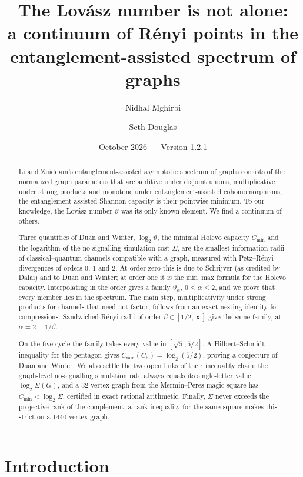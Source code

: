 \documentclass[11pt]{article}
\title{The Lov\'asz number is not alone:\\[3pt]
\large a continuum of R\'enyi points in the entanglement-assisted spectrum of graphs}
\author{Nidhal Mghirbi \and Seth Douglas}
\date{October 2026 --- Version 1.2.1}
\theoremstyle{definition}
\newcommand{\vt}{\vartheta}
\newcommand{\Cmin}{C_{\min}}
\begin{document}
\maketitle

\begin{abstract}
Li and Zuiddam's entanglement-assisted asymptotic spectrum of graphs consists
of the normalized graph parameters that are additive under disjoint unions,
multiplicative under strong products and monotone under
entanglement-assisted cohomomorphisms; the entanglement-assisted Shannon
capacity is their pointwise minimum.  To our knowledge, the Lov\'asz number
$\vt$ was its only known element.  We find a continuum of others.

Three quantities of Duan and Winter, $\log_2\vt$, the minimal Holevo capacity
$\Cmin$ and the logarithm of the no-signalling simulation cost $\Sigma$, are
the smallest information radii of classical--quantum channels compatible with
a graph, measured with Petz--R\'enyi divergences of orders $0$, $1$ and $2$.
At order zero this is due to Schrijver (as credited by Dalai) and to Duan and
Winter; at order one it is the min--max formula for the Holevo capacity.
Interpolating in the order gives a family $\vt_\alpha$, $0\le\alpha\le2$, and
we prove that every member lies in the spectrum.  The main step,
multiplicativity under strong products for channels that need not factor,
follows from an exact nesting identity for compressions.  Sandwiched R\'enyi
radii of order $\beta\in[1/2,\infty]$ give the same family, at
$\alpha=2-1/\beta$.

On the five-cycle the family takes every value in $[\sqrt5,5/2]$.  A
Hilbert--Schmidt inequality for the pentagon gives $\Cmin(C_5)=\log_2(5/2)$,
proving a conjecture of Duan and Winter.  We also settle the two open links of
their inequality chain: the graph-level no-signalling simulation rate always
equals its single-letter value $\log_2\Sigma(G)$, and a 32-vertex graph from
the Mermin--Peres magic square has $\Cmin<\log_2\Sigma$, certified in exact
rational arithmetic.  Finally, $\Sigma$ never exceeds the projective rank of
the complement; a rank inequality for the same square makes this strict on a
1440-vertex graph.
\end{abstract}

\section{Introduction}\label{sec:intro}
\end{document}
